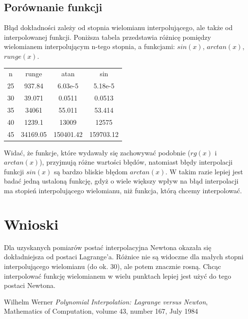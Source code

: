 \documentclass[paper=a4, fontsize=11pt]{scrartcl} %
\numberwithin{equation}{section} %
\numberwithin{figure}{section} %
\numberwithin{table}{section} %
\begin{document}
\subsection{Porównanie funkcji}
Błąd dokładności zależy od stopnia wielomianu interpolującego, ale także od interpolowanej funkcji.
Poniższa tabela przedstawia różnicę pomiędzy wielomianem interpolującym n-tego stopnia, a funkcjami:
$sin(x)$, $arctan(x)$, $runge(x)$.
\begin{center}
\begin{tabular}{ |c|c|c|c| } 
 \hline
 n & runge & atan & sin \\ 
 25 & 937.84 & 6.03e-5 & 5.18e-5 \\ 
 30 & 39.071 & 0.0511 & 0.0513 \\
 35 & 34061 & 55.011 & 53.414 \\
 40 & 1239.1 & 13009 & 12575 \\
 45 & 34169.05 & 150401.42 & 159703.12 \\ 
 \hline
\end{tabular}
\end{center}
Widać, że funkcje, które wydawały się zachowywać podobnie ($rg(x)$ i $arctan(x)$), przyjmują
różne wartości błędów, natomiast błędy interpolacji funkcji $sin(x)$ są bardzo bliskie błędom
$arctan(x)$. W takim razie lepiej jest badać jedną ustaloną funkcję, gdyż o wiele większy wpływ
na błąd interpolacji ma stopień interpolującego wielomianu, niż funkcja, którą chcemy interpolować.

\section{Wnioski}
Dla uzyskanych pomiarów postać interpolacyjna Newtona okazała się dokładniejsza od postaci Lagrange'a.
Różnice nie są widoczne dla małych stopni interpolującego wielomianu (do ok. 30), ale potem znacznie rosną.
Chcąc interpolować funkcję wielomianem w wielu punktach lepiej jest użyć do tego postaci Newtona.


\begin{thebibliography}{9}

  Wilhelm Werner
  \textit{Polynomial Interpolation: Lagrange versus Newton}, \\
  Mathematics of Computation, volume 43, number 167, July 1984
\end{thebibliography}
\end{document}
